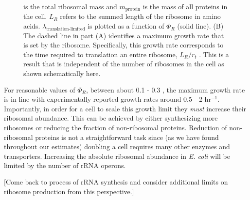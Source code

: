 \begin{figure}
\begin{fullwidth}
{{            is the total ribosomal mass and $m_{\textrm{protein}}$ is the mass
            of all proteins in the cell. $L_R$ refers to the summed length of
            the ribosome in amino acids.
            $\lambda_{\textrm{translation-limited}}$ is plotted as a function of
            $\Phi_R$ (solid line). (B) The dashed line in part (A) identifies a
            maximum growth rate that is set by the ribosome. Specifically, this
            growth rate corresponds to the time required to  translation an
            entire ribosome, $L_R/ r_t$ . This is a result that is independent
            of the number of ribosomes in the cell as shown schematically here.
            }
        \label{fig:translation_1}
        }
  \end{fullwidth}
\end{figure}

For reasonable values of $\Phi_R$, between about 0.1 - 0.3 \citep{scott2010},
the maximum growth rate is in line with experimentally reported growth rates
around 0.5 - 2 hr$^{-1}$.
Importantly, in order for a cell to scale this growth
limit they \textit{must} increase their ribosomal abundance.
This can be achieved by either synthesizing more ribosomes or reducing the
fraction of non-ribosomal proteins. Reduction of non-ribosomal proteins is not
a straightforward task since (as we have found throughout our estimates) doubling a
cell requires many other enzymes and transporters. Increasing the absolute
ribosomal abundance in \textit{E. coli} will be limited by the number of
rRNA operons.

[Come back to process of rRNA synthesis and consider additional limits on ribosome production from this perspective.]
